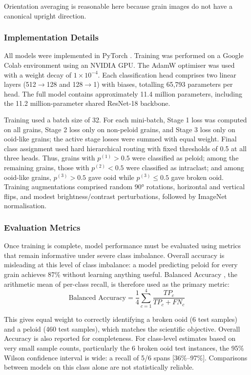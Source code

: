 \documentclass[a4paper,fleqn]{cas-dc}
\begin{document}
Orientation averaging is reasonable here because grain images do not have a canonical upright direction.

\subsubsection{Implementation Details}

All models were implemented in PyTorch \citep{paszke2019pytorch}. Training was performed on a Google Colab environment using an NVIDIA GPU. The AdamW optimiser \citep{loshchilov2019adamw} was used with a weight decay of $1\times10^{-4}$. Each classification head comprises two linear layers (512$\to$128 and 128$\to$1) with biases, totalling 65,793 parameters per head. The full model contains approximately 11.4 million parameters, including the 11.2 million-parameter shared ResNet-18 backbone.

Training used a batch size of 32. For each mini-batch, Stage 1 loss was computed on all grains, Stage 2 loss only on non-peloid grains, and Stage 3 loss only on ooid-like grains; the active stage losses were summed with equal weight. Final class assignment used hard hierarchical routing with fixed thresholds of 0.5 at all three heads. Thus, grains with $p^{(1)}>0.5$ were classified as peloid; among the remaining grains, those with $p^{(2)}<0.5$ were classified as intraclast; and among ooid-like grains, $p^{(3)}>0.5$ gave ooid while $p^{(3)}\leq0.5$ gave broken ooid. Training augmentations comprised random 90° rotations, horizontal and vertical flips, and modest brightness/contrast perturbations, followed by ImageNet normalisation.

\subsubsection{Evaluation Metrics}

Once training is complete, model performance must be evaluated using metrics that remain informative under severe class imbalance. Overall accuracy is misleading at this level of class imbalance: a model predicting peloid for every grain achieves 87\% without learning anything useful. Balanced Accuracy \citep{brodersen2010balanced}, the arithmetic mean of per-class recall, is therefore used as the primary metric:
\begin{equation}
\text{Balanced Accuracy} = \frac{1}{4}\sum_{c=1}^{4} \frac{TP_c}{TP_c + FN_c}
\end{equation}

This gives equal weight to correctly identifying a broken ooid (6 test samples) and a peloid (460 test samples), which matches the scientific objective. Overall Accuracy is also reported for completeness. For class-level estimates based on very small sample counts, particularly the 6 broken ooid test instances, the 95\% Wilson confidence interval is wide: a recall of 5/6 spans [36\%--97\%]. Comparisons between models on this class alone are not statistically reliable.
\end{document}
